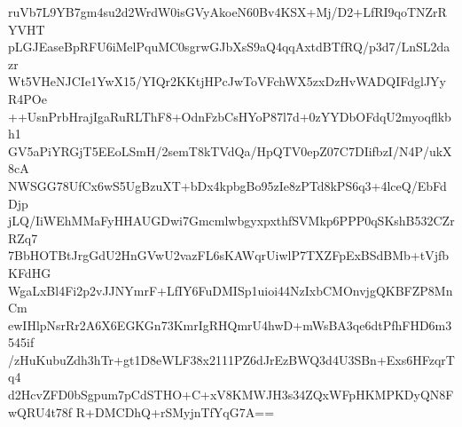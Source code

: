 ruVb7L9YB7gm4su2d2WrdW0isGVyAkoeN60Bv4KSX+Mj/D2+LfRI9qoTNZrRYVHT
pLGJEaseBpRFU6iMelPquMC0sgrwGJbXsS9aQ4qqAxtdBTfRQ/p3d7/LnSL2dazr
Wt5VHeNJCIe1YwX15/YIQr2KKtjHPcJwToVFchWX5zxDzHvWADQIFdglJYyR4POe
++UsnPrbHrajIgaRuRLThF8+OdnFzbCsHYoP87l7d+0zYYDbOFdqU2myoqflkbh1
GV5aPiYRGjT5EEoLSmH/2semT8kTVdQa/HpQTV0epZ07C7DIifbzI/N4P/ukX8cA
NWSGG78UfCx6wS5UgBzuXT+bDx4kpbgBo95zIe8zPTd8kPS6q3+4lceQ/EbFdDjp
jLQ/IiWEhMMaFyHHAUGDwi7GmcmlwbgyxpxthfSVMkp6PPP0qSKshB532CZrRZq7
7BbHOTBtJrgGdU2HnGVwU2vazFL6sKAWqrUiwlP7TXZFpExBSdBMb+tVjfbKFdHG
WgaLxBl4Fi2p2vJJNYmrF+LfIY6FuDMISp1uioi44NzIxbCMOnvjgQKBFZP8MnCm
ewIHlpNsrRr2A6X6EGKGn73KmrIgRHQmrU4hwD+mWsBA3qe6dtPfhFHD6m3545if
/zHuKubuZdh3hTr+gt1D8eWLF38x2111PZ6dJrEzBWQ3d4U3SBn+Exs6HFzqrTq4
d2HcvZFD0bSgpum7pCdSTHO+C+xV8KMWJH3s34ZQxWFpHKMPKDyQN8FwQRU4t78f
R+DMCDhQ+rSMyjnTfYqG7A==
